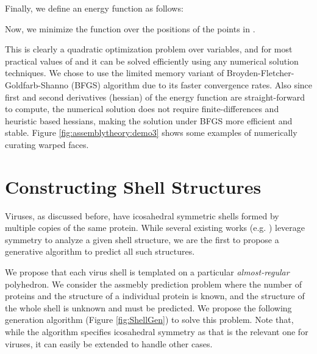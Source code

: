 \documentclass[11pt]{article}
\newcommand{\1}{\mathds{1}}
\begin{document}
Finally, we define an energy function  as follows:



Now, we minimize the function  over the positions of the points in .

This is clearly a quadratic optimization problem over  variables, and for most practical values of  and  it can be solved efficiently using any numerical solution techniques. We chose to use the limited memory variant of Broyden-Fletcher-Goldfarb-Shanno (BFGS) algorithm \cite{Byrd_Lu_Nocedal_Zhu_1995} due to its faster convergence rates. Also since first and second derivatives (hessian) of the energy function are straight-forward to compute, the numerical solution does not require finite-differences and heuristic based hessians, making the solution under BFGS more efficient and stable. Figure \ref{fig:assemblytheory:demo3} shows some examples of numerically curating warped faces.

\section{Constructing Shell Structures}
Viruses, as discussed before, have icosahedral symmetric shells formed by multiple copies of the same protein. While several existing works (e.g. \cite{berger94,zlotnick05,zandi05,Rapaport_2004,Bona_Sitharam_Vince_2011,Bahadur_Rodier_Janin_2007,Carrillo-Tripp_Brooks_Reddy_2008,Cheng_Brooks_2013}) leverage symmetry to analyze a given shell structure, we are the first to propose a generative algorithm to predict all such structures.

We propose that each virus shell is templated on a particular \emph{almost-regular} polyhedron. We consider the assmebly prediction problem where the number of proteins and the structure of a individual protein is known, and the structure of the whole shell is unknown and must be predicted. We propose the following generation algorithm (Figure \ref{fig:ShellGen}) to solve this problem. Note that, while the algorithm specifies icosahedral symmetry as that is the relevant one for viruses, it can easily be extended to handle other cases.
\end{document}
